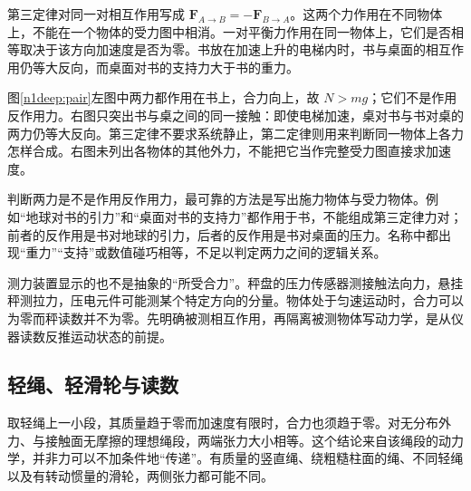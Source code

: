 第三定律对同一对相互作用写成 $\bm F_{A\to B}=-\bm F_{B\to A}$。这两个力作用在不同物体上，不能在一个物体的受力图中相消。一对平衡力作用在同一物体上，它们是否相等取决于该方向加速度是否为零。书放在加速上升的电梯内时，书与桌面的相互作用仍等大反向，而桌面对书的支持力大于书的重力。

图\ref{n1deep:pair}左图中两力都作用在书上，合力向上，故 $N>mg$；它们不是作用反作用力。右图只突出书与桌之间的同一接触：即使电梯加速，桌对书与书对桌的两力仍等大反向。第三定律不要求系统静止，第二定律则用来判断同一物体上各力怎样合成。右图未列出各物体的其他外力，不能把它当作完整受力图直接求加速度。

判断两力是不是作用反作用力，最可靠的方法是写出施力物体与受力物体。例如“地球对书的引力”和“桌面对书的支持力”都作用于书，不能组成第三定律力对；前者的反作用是书对地球的引力，后者的反作用是书对桌面的压力。名称中都出现“重力”“支持”或数值碰巧相等，不足以判定两力之间的逻辑关系。

测力装置显示的也不是抽象的“所受合力”。秤盘的压力传感器测接触法向力，悬挂秤测拉力，压电元件可能测某个特定方向的分量。物体处于匀速运动时，合力可以为零而秤读数并不为零。先明确被测相互作用，再隔离被测物体写动力学，是从仪器读数反推运动状态的前提。

\subsection{轻绳、轻滑轮与读数}
取轻绳上一小段，其质量趋于零而加速度有限时，合力也须趋于零。对无分布外力、与接触面无摩擦的理想绳段，两端张力大小相等。这个结论来自该绳段的动力学，并非力可以不加条件地“传递”。有质量的竖直绳、绕粗糙柱面的绳、不同轻绳以及有转动惯量的滑轮，两侧张力都可能不同。

